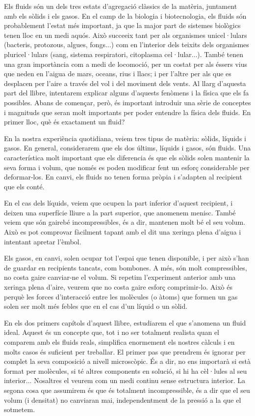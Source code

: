 \documentclass[12pt]{book}
\begin{document}
Els fluids són un dels tres estats d'agregació clàssics de la matèria, juntament amb els sòlids i els gasos. En el camp de la biologia i biotecnologia, els fluids són probablement l'estat més important, ja que la major part de sistemes biològics tenen lloc en un medi aquós. Això succeeix tant per als organismes unicel·lulars (bacteris, protozous, algues, fongs...) com en l'interior dels teixits dels organismes pluricel·lulars (sang, sistema respiratori, citoplasma cel·lular...). També tenen una gran importància com a medi de locomoció, per un costat per als éssers vius que neden en l'aigua de mars, oceans, rius i llacs; i per l'altre per als que es desplacen per l'aire a través del vol i del moviment dels vents. Al llarg d'aquesta part del llibre, intentarem explicar alguns d'aquests fenòmens i la física que els fa possibles. Abans de començar, però, és important introduir una sèrie de conceptes i magnituds que seran molt importants per poder entendre la física dels fluids. En primer lloc, què és exactament un fluid?

En la nostra experiència quotidiana, veiem tres tipus de matèria: sòlids, líquids i gasos. En general, considerarem que els dos últims, líquids i gasos, són fluids. Una característica molt important que els diferencia és que els sòlids solen mantenir la seva forma i volum, que només es poden modificar fent un esforç considerable per deformar-los. En canvi, els fluids no tenen forma pròpia i s'adapten al recipient que els conté. 

En el cas dels líquids, veiem que ocupen la part inferior d'aquest recipient, i deixen una superfície lliure a la part superior, que anomenem menisc. També veiem que són gairebé incompressibles, és a dir, mantenen molt bé el seu volum. Això es pot comprovar fàcilment tapant amb el dit una xeringa plena d'aigua i intentant apretar l'èmbol.  

Els gasos, en canvi, solen ocupar tot l'espai que tenen disponible, i per això s'han de guardar en recipients tancats, com bombones. A més, són molt compressibles, no costa gaire canviar-ne el volum. Si repetim l'experiment anterior amb una xeringa plena d'aire, veurem que no costa gaire esforç comprimir-lo. Això és perquè les forces d'interacció entre les molècules (o àtoms) que formen un gas solen ser molt més febles que en el cas d'un líquid o un sòlid.

En els dos primers capítols d'aquest llibre, estudiarem el que s'anomena un fluid ideal. Aquest és un concepte que, tot i no ser totalment realista quan el comparem amb els fluids reals, simplifica enormement els nostres càlculs i en molts casos és suficient per treballar. El primer pas que prendrem és ignorar per complet la seva composició a nivell microscòpic. És a dir, no ens importarà si està format per molècules, si té altres components en solució, si hi ha cèl·lules al seu interior... Nosaltres el veurem com un medi continu sense estructura interior. La segona cosa que assumirem és que és totalment incompressible, és a dir que el seu volum (i densitat) no canviaran mai, independentment de la pressió a la que el sotmetem. 
\end{document}
